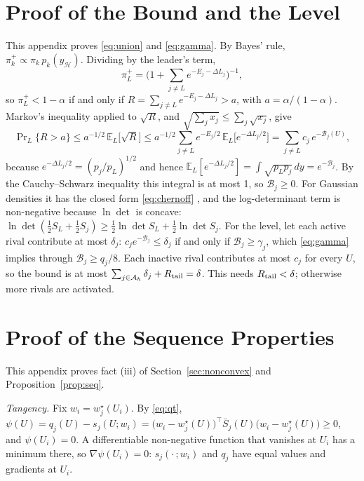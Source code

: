 \documentclass[journal,onecolumn,11pt]{IEEEtran}
\newcommand{\E}{\mathbb{E}}
\newcommand{\tp}{^{\top}}
\begin{document}
\section{Proof of the Bound and the Level}\label{app:bound}
This appendix proves \eqref{eq:union} and \eqref{eq:gamma}. By Bayes' rule, $\pi_k^+\propto\pi_k\,p_k(y_{\mathcal H})$. Dividing by the leader's term,
\begin{equation}\label{eq:A1}
\pi_L^+=\Big(1+\sum_{j\ne L}e^{-E_j-\Delta L_j}\Big)^{-1},
\end{equation}
so $\pi_L^+<1-\alpha$ if and only if $R=\sum_{j\ne L}e^{-E_j-\Delta L_j}>a$, with $a=\alpha/(1-\alpha)$. Markov's inequality applied to $\sqrt R$, and $\sqrt{\textstyle\sum_jx_j}\le\sum_j\sqrt{x_j}$, give
\begin{equation}\label{eq:A2}
\Pr\nolimits_L\{R>a\}\le a^{-1/2}\,\E_L\big[\sqrt R\big]\le a^{-1/2}\sum_{j\ne L}e^{-E_j/2}\,\E_L\big[e^{-\Delta L_j/2}\big]=\sum_{j\ne L}c_j\,e^{-\mathcal B_j(U)},
\end{equation}
because $e^{-\Delta L_j/2}=(p_j/p_L)^{1/2}$ and hence $\E_L[e^{-\Delta L_j/2}]=\int\sqrt{p_Lp_j}\,dy=e^{-\mathcal B_j}$. By the Cauchy--Schwarz inequality this integral is at most 1, so $\mathcal B_j\ge0$. For Gaussian densities it has the closed form \eqref{eq:chernoff} \cite{kailath1967}, and the log-determinant term is non-negative because $\ln\det$ is concave: $\ln\det(\tfrac12S_L+\tfrac12S_j)\ge\tfrac12\ln\det S_L+\tfrac12\ln\det S_j$. For the level, let each active rival contribute at most $\delta_j$: $c_je^{-\mathcal B_j}\le\delta_j$ if and only if $\mathcal B_j\ge\gamma_j$, which \eqref{eq:gamma} implies through $\mathcal B_j\ge q_j/8$. Each inactive rival contributes at most $c_j$ for every $U$, so the bound is at most $\sum_{j\in\mathcal A_h}\delta_j+R_{\rm tail}=\delta$. This needs $R_{\rm tail}<\delta$; otherwise more rivals are activated.

\section{Proof of the Sequence Properties}\label{app:seq}
This appendix proves fact (iii) of Section~\ref{sec:nonconvex} and Proposition~\ref{prop:seq}.

\emph{Tangency.} Fix $w_i=w_j^\star(U_i)$. By \eqref{eq:qt}, $\psi(U)=q_j(U)-s_j(U;w_i)=\big(w_i-w_j^\star(U)\big)\tp\bar S_j(U)\big(w_i-w_j^\star(U)\big)\ge0$, and $\psi(U_i)=0$. A differentiable non-negative function that vanishes at $U_i$ has a minimum there, so $\nabla\psi(U_i)=0$: $s_j(\cdot\,;w_i)$ and $q_j$ have equal values and gradients at $U_i$.
\end{document}
